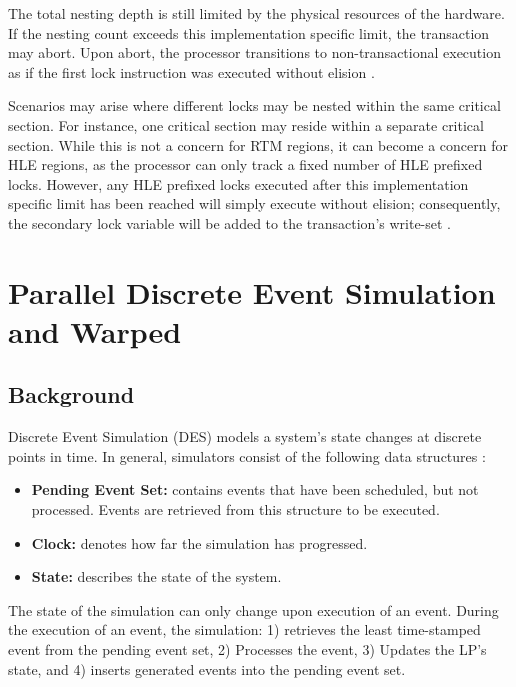 \documentclass[11pt]{book}
\begin{document}
The total nesting depth is still limited by the physical resources of the hardware.  If
the nesting count exceeds this implementation specific limit, the transaction may abort.
Upon abort, the processor transitions to non-transactional execution as if the first lock
instruction was executed without elision \cite{intel_prog_ref}.

Scenarios may arise where different locks may be nested within the same critical section.
For instance, one critical section may reside within a separate critical section.  While
this is not a concern for RTM regions, it can become a concern for HLE regions, as the
processor can only track a fixed number of HLE prefixed locks.  However, any HLE prefixed
locks executed after this implementation specific limit has been reached will simply
execute without elision; consequently, the secondary lock variable will be added to the
transaction's write-set \cite{intel_prog_ref}.

\chapter{Parallel Discrete Event Simulation and Warped}

\section{Background}

Discrete Event Simulation (DES) models a system's state changes at discrete points in
time.  In general, simulators consist of the following data structures \cite{fujimoto}:

\begin{itemize}
  \item\textbf{Pending Event Set:} contains events that have been scheduled, but not
    processed.  Events are retrieved from this structure to be executed.
  \item\textbf{Clock:} denotes how far the simulation has progressed.
  \item\textbf{State:} describes the state of the system.
\end{itemize}

\noindent
The state of the simulation can only change upon execution of an event.  During the
execution of an event, the simulation: 1) retrieves the least time-stamped event from the
pending event set, 2) Processes the event, 3) Updates the LP's state, and 4) inserts
generated events into the pending event set.
\end{document}
